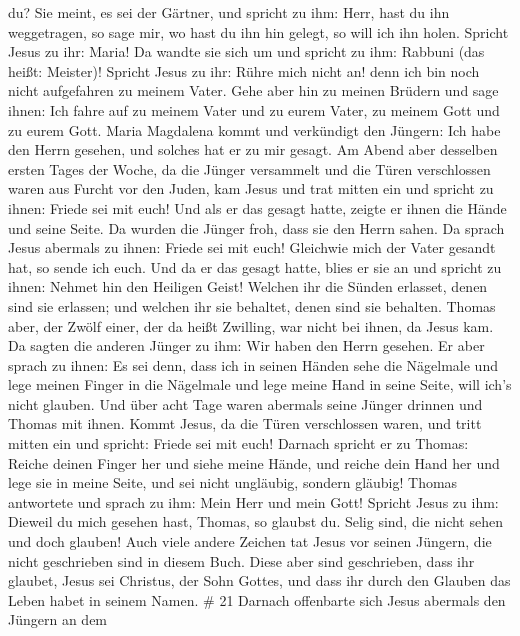 du? Sie meint, es sei der Gärtner, und spricht zu ihm: Herr, hast du ihn
weggetragen, so sage mir, wo hast du ihn hin gelegt, so will ich ihn
holen.  Spricht Jesus zu ihr: Maria! Da wandte sie sich um
und spricht zu ihm: Rabbuni (das heißt: Meister)!  Spricht
Jesus zu ihr: Rühre mich nicht an! denn ich bin noch nicht aufgefahren
zu meinem Vater. Gehe aber hin zu meinen Brüdern und sage ihnen: Ich
fahre auf zu meinem Vater und zu eurem Vater, zu meinem Gott und zu
eurem Gott.  Maria Magdalena kommt und verkündigt den
Jüngern: Ich habe den Herrn gesehen, und solches hat er zu mir gesagt.
 Am Abend aber desselben ersten Tages der Woche, da die
Jünger versammelt und die Türen verschlossen waren aus Furcht vor den
Juden, kam Jesus und trat mitten ein und spricht zu ihnen: Friede sei
mit euch!  Und als er das gesagt hatte, zeigte er ihnen die
Hände und seine Seite. Da wurden die Jünger froh, dass sie den Herrn
sahen.  Da sprach Jesus abermals zu ihnen: Friede sei mit
euch! Gleichwie mich der Vater gesandt hat, so sende ich euch.
 Und da er das gesagt hatte, blies er sie an und spricht zu
ihnen: Nehmet hin den Heiligen Geist!  Welchen ihr die
Sünden erlasset, denen sind sie erlassen; und welchen ihr sie behaltet,
denen sind sie behalten.  Thomas aber, der Zwölf einer, der
da heißt Zwilling, war nicht bei ihnen, da Jesus kam.  Da
sagten die anderen Jünger zu ihm: Wir haben den Herrn gesehen. Er aber
sprach zu ihnen: Es sei denn, dass ich in seinen Händen sehe die
Nägelmale und lege meinen Finger in die Nägelmale und lege meine Hand in
seine Seite, will ich's nicht glauben.  Und über acht Tage
waren abermals seine Jünger drinnen und Thomas mit ihnen. Kommt Jesus,
da die Türen verschlossen waren, und tritt mitten ein und spricht:
Friede sei mit euch!  Darnach spricht er zu Thomas: Reiche
deinen Finger her und siehe meine Hände, und reiche dein Hand her und
lege sie in meine Seite, und sei nicht ungläubig, sondern gläubig!
 Thomas antwortete und sprach zu ihm: Mein Herr und mein
Gott!  Spricht Jesus zu ihm: Dieweil du mich gesehen hast,
Thomas, so glaubst du. Selig sind, die nicht sehen und doch glauben!
 Auch viele andere Zeichen tat Jesus vor seinen Jüngern,
die nicht geschrieben sind in diesem Buch.  Diese aber sind
geschrieben, dass ihr glaubet, Jesus sei Christus, der Sohn Gottes, und
dass ihr durch den Glauben das Leben habet in seinem Namen. \# 21
 Darnach offenbarte sich Jesus abermals den Jüngern an dem
